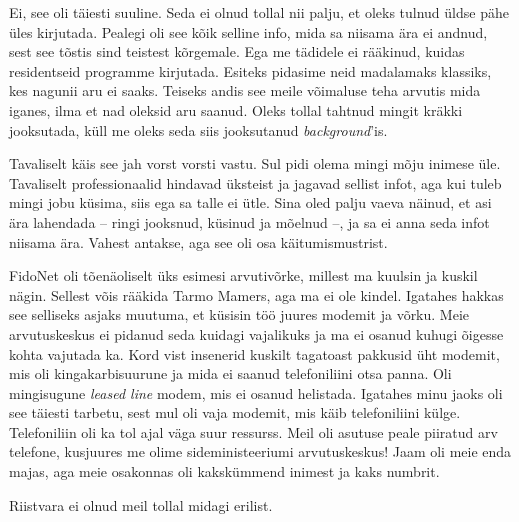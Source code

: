 
Ei, see oli täiesti suuline. Seda ei olnud tollal nii palju, et oleks tulnud üldse pähe üles 
kirjutada. Pealegi oli see kõik selline info, mida sa niisama ära ei 
andnud, sest see tõstis sind teistest kõrgemale. Ega me 
tädidele ei rääkinud, kuidas residentseid programme kirjutada. Esiteks
pidasime neid madalamaks klassiks, kes nagunii aru ei saaks. Teiseks andis see 
meile võimaluse teha arvutis mida iganes, ilma et nad oleksid aru
saanud. Oleks tollal tahtnud mingit kräkki jooksutada, küll me oleks seda siis
jooksutanud \emph{background}'is.


Tavaliselt käis see jah vorst vorsti vastu. Sul pidi olema mingi mõju 
inimese üle. Tavaliselt professionaalid hindavad üksteist ja jagavad sellist 
infot, aga kui tuleb mingi jobu küsima, siis ega sa talle ei ütle. Sina oled palju 
vaeva näinud, et asi ära lahendada -- ringi jooksnud, küsinud ja mõelnud --, ja 
sa ei anna seda infot niisama ära. Vahest antakse, aga see oli osa 
käitumismustrist. 

FidoNet oli tõenäoliselt üks esimesi arvutivõrke, millest ma kuulsin ja kuskil 
nägin. Sellest võis rääkida Tarmo Mamers, aga ma ei ole kindel. Igatahes hakkas see selliseks asjaks muutuma, et 
küsisin töö juures modemit ja võrku. Meie 
arvutuskeskus ei pidanud seda kuidagi vajalikuks ja ma ei osanud kuhugi 
õigesse kohta vajutada ka. Kord vist insenerid kuskilt tagatoast 
pakkusid üht modemit, mis oli kingakarbisuurune ja mida ei saanud telefoniliini otsa panna. Oli mingisugune 
\emph{leased line} modem, mis ei osanud helistada. Igatahes 
minu jaoks oli see täiesti tarbetu, sest mul oli vaja modemit, mis käib 
telefoniliini külge. Telefoniliin oli ka tol ajal väga suur ressurss. Meil oli 
asutuse peale piiratud arv telefone, kusjuures me olime sideministeeriumi 
arvutuskeskus! Jaam oli meie enda majas, aga meie osakonnas oli kakskümmend 
inimest ja kaks numbrit. 


Riistvara ei olnud meil tollal midagi erilist.


